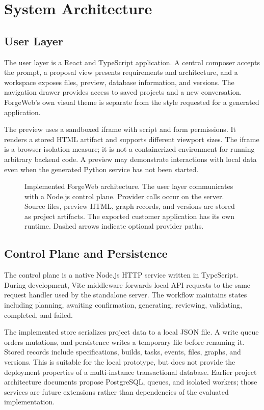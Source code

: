 \documentclass[conference,a4paper]{IEEEtran}
\begin{document}
\section{System Architecture}
\subsection{User Layer}
The user layer is a React and TypeScript application. A central composer accepts the prompt, a proposal view presents requirements and architecture, and a workspace exposes files, preview, database information, and versions. The navigation drawer provides access to saved projects and a new conversation. ForgeWeb's own visual theme is separate from the style requested for a generated application.

The preview uses a sandboxed iframe with script and form permissions. It renders a stored HTML artifact and supports different viewport sizes. The iframe is a browser isolation measure; it is not a containerized environment for running arbitrary backend code. A preview may demonstrate interactions with local data even when the generated Python service has not been started.

\begin{figure}[t]
\centering

\caption{Implemented ForgeWeb architecture. The user layer communicates with a Node.js control plane. Provider calls occur on the server. Source files, preview HTML, graph records, and versions are stored as project artifacts. The exported customer application has its own runtime. Dashed arrows indicate optional provider paths.}
\label{fig:architecture}
\end{figure}

\subsection{Control Plane and Persistence}
The control plane is a native Node.js HTTP service written in TypeScript. During development, Vite middleware forwards local API requests to the same request handler used by the standalone server. The workflow maintains states including planning, awaiting confirmation, generating, reviewing, validating, completed, and failed.

The implemented store serializes project data to a local JSON file. A write queue orders mutations, and persistence writes a temporary file before renaming it. Stored records include specifications, builds, tasks, events, files, graphs, and versions. This is suitable for the local prototype, but does not provide the deployment properties of a multi-instance transactional database. Earlier project architecture documents propose PostgreSQL, queues, and isolated workers; those services are future extensions rather than dependencies of the evaluated implementation.
\end{document}
